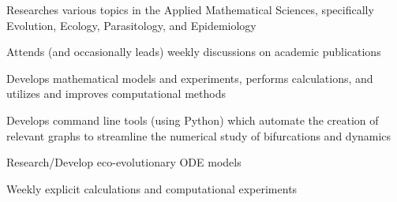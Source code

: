\documentclass[letterpaper]{deedy-resume} %
\begin{document}
\begin{minipage}[t]{0.66\textwidth}

\begin{tightitemize}
\item Researches various topics in the Applied Mathematical Sciences, specifically Evolution, Ecology, Parasitology, and Epidemiology
\item Attends (and occasionally leads) weekly discussions on academic publications
\item Develops mathematical models and experiments, performs calculations, and utilizes and improves computational methods
\item Develops command line tools (using Python) which automate the creation of relevant graphs to streamline the numerical study of bifurcations and dynamics
\end{tightitemize}
\vspace{7pt}


\begin{tightitemize}
\item Research/Develop eco-evolutionary ODE models
\item Weekly explicit calculations and computational experiments
\end{tightitemize}








\end{minipage}
\end{document}
